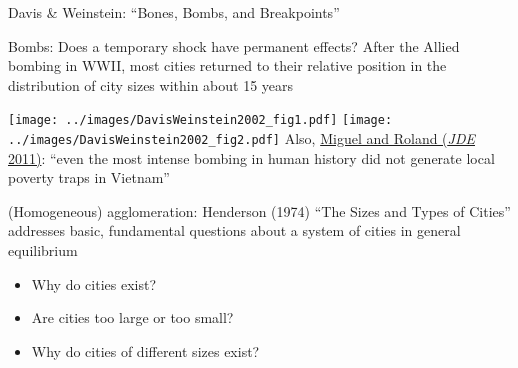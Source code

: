 \documentclass[10pt,notes=hide]{beamer}
\begin{document}
\begin{frame}{Davis \& Weinstein: ``Bones, Bombs, and Breakpoints''}
{\small Bombs: Does a temporary shock have permanent effects? After the Allied bombing in WWII, most cities returned to their relative position in the distribution of city sizes within about 15 years \par}
\texttt{[image: ../images/DavisWeinstein2002\_fig1.pdf]}
\texttt{[image: ../images/DavisWeinstein2002\_fig2.pdf]}
Also, \href{https://www.sciencedirect.com/science/article/pii/S0304387810000817}{Miguel and Roland (\textit{JDE} 2011)}: ``even the most intense bombing in human history did not generate local poverty traps in Vietnam''
\end{frame}
\begin{frame}{(Homogeneous) agglomeration: Henderson (1974)}
``The Sizes and Types of Cities'' addresses basic, fundamental questions about a system of cities in general equilibrium
\begin{itemize}
\item Why do cities exist? 
\item Are cities too large or too small?
\item Why do cities of different sizes exist?
\end{itemize}
\end{frame}
\end{document}
